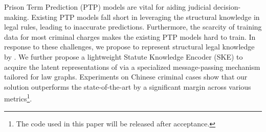 Prison Term Prediction (PTP) models are vital for aiding judicial decision-making. Existing PTP models fall short in leveraging the structural knowledge in legal rules, leading to inaccurate predictions. Furthermore, the scarcity of training data for most criminal charges makes the existing PTP models hard to train. In response to these challenges, we propose to represent structural legal knowledge by . We further propose a lightweight Statute Knowledge Encoder (SKE) to acquire the latent representations of  via a specialized message-passing mechanism tailored for law graphs. Experiments on Chinese criminal cases show that our solution outperforms the state-of-the-art by a significant margin across various metrics\footnote{The code used in this paper will be released after acceptance.}. 

